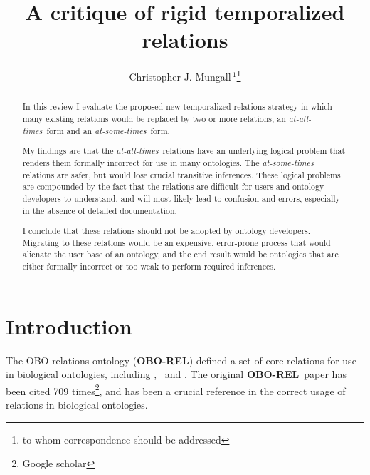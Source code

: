 \documentclass{bioinfo}
\def\partOf{\pr{part\_of}}
\def\isA{\pr{is\_a}}
\def\derivesFrom{\pr{derives\_from}}
\def\OBOREL{\textbf{OBO-REL}}
\begin{document}

\title{A critique of rigid temporalized relations}

\author{Christopher J. Mungall\,$^{1}$\footnote{to whom correspondence should be addressed}}
\address{$^{1}$Genomics Division, Lawrence Berkeley National Laboratory, MS84R017, 1 Cyclotron Road, Berkeley, CA 94720 USA}

\history{}

\editor{}

\maketitle

\begin{abstract}

  In this review I evaluate the proposed new temporalized relations
  strategy in which many existing relations would be replaced by two
  or more relations, an \emph{at-all-times}\ form and an
  \emph{at-some-times}\ form.

  My findings are that the \emph{at-all-times}\ relations have an
  underlying logical problem that renders them formally incorrect for
  use in many ontologies. The \emph{at-some-times} relations are
  safer, but would lose crucial transitive inferences. These logical
  problems are compounded by the fact that the relations are difficult
  for users and ontology developers to understand, and will most
  likely lead to confusion and errors, especially in the absence of
  detailed documentation.

  I conclude that these relations should not be adopted by ontology
  developers. Migrating to these relations would be an expensive,
  error-prone process that would alienate the user base of an
  ontology, and the end result would be ontologies that are either
  formally incorrect or too weak to perform required inferences.

\end{abstract}

\section{Introduction}

The OBO relations ontology (\OBOREL) defined a set of core relations
for use in biological ontologies, including \isA, \partOf\ and
\derivesFrom\cite{Smith2005}. The original \OBOREL\ paper has been
cited 709 times\footnote{Google scholar}, and has been a crucial
reference in the correct usage of relations in biological ontologies.
\end{document}
